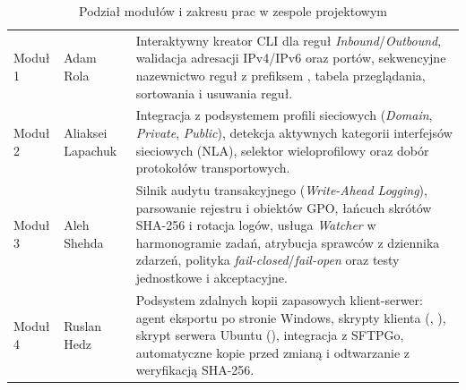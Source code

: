 \begin{table}[H]
    \centering
    \caption{Podział modułów i zakresu prac w zespole projektowym}\label{tab:podzial-zadan}
    \tablefont
    \begin{tabularx}{\linewidth}{C{2.0cm} L{3.6cm} Y}
        \toprule
         &  &  \\
        \midrule
        Moduł 1 & Adam Rola & Interaktywny kreator CLI dla reguł \textit{Inbound}/\textit{Outbound}, walidacja adresacji IPv4/IPv6 oraz portów, sekwencyjne nazewnictwo reguł z prefiksem , tabela przeglądania, sortowania i usuwania reguł. \\
        Moduł 2 & Aliaksei Lapachuk & Integracja z podsystemem profili sieciowych (\textit{Domain}, \textit{Private}, \textit{Public}), detekcja aktywnych kategorii interfejsów sieciowych (NLA), selektor wieloprofilowy oraz dobór protokołów transportowych. \\
        Moduł 3 & Aleh Shehda & Silnik audytu transakcyjnego (\textit{Write-Ahead Logging}), parsowanie rejestru i obiektów GPO, łańcuch skrótów SHA-256 i rotacja logów, usługa \textit{Watcher} w harmonogramie zadań, atrybucja sprawców z dziennika zdarzeń, polityka \textit{fail-closed}/\textit{fail-open} oraz testy jednostkowe i akceptacyjne. \\
        Moduł 4 & Ruslan Hedz & Podsystem zdalnych kopii zapasowych klient-serwer: agent eksportu po stronie Windows, skrypty klienta (, ), skrypt serwera Ubuntu (), integracja z SFTPGo, automatyczne kopie przed zmianą i odtwarzanie z weryfikacją SHA-256. \\
        \bottomrule
    \end{tabularx}
\end{table}
